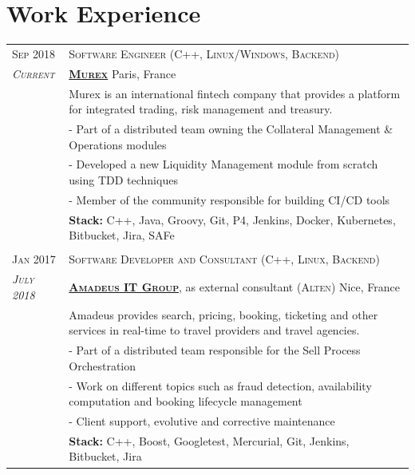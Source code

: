 \documentclass[a4paper,10pt]{article}
\begin{document}
   \vspace{-7.5mm}

   \section{Work Experience}
   \begin{tabular}{p{1.7cm}|p{15.5cm}}
      \centering\textsc{Sep 2018} &
      \textsc{Software Engineer (C++, Linux/Windows, Backend)}\\
      \centering\emph{\textsc{Current}} &
      \textsc{\textbf{\href{https://www.murex.com/}{Murex}}} \hfill Paris, France\\
      & Murex is an international fintech company that provides a platform for integrated trading, risk management and treasury.\\
      & - Part of a distributed team owning the Collateral Management \& Operations modules\\
      & - Developed a new Liquidity Management module from scratch using TDD techniques\\
      & - Member of the community responsible for building CI/CD tools\\
      & \textbf{Stack:} C++, Java, Groovy, Git, P4, Jenkins, Docker, Kubernetes, Bitbucket, Jira, SAFe\\
      
      \multicolumn{2}{c}{} \\
      \centering\textsc{Jan 2017} &
      \textsc{Software Developer and Consultant (C++, Linux, Backend)} \\
      \centering\emph{\textsc{July 2018}} &
      \textsc{\textbf{\href{http://www.amadeus.com/}{Amadeus IT Group}}}, as external consultant (\textsc{Alten}) \hfill Nice, France\\
      & Amadeus provides search, pricing, booking, ticketing and other services in real-time to travel providers and travel agencies.\\
      & - Part of a distributed team responsible for the Sell Process Orchestration\\
      & - Work on different topics such as fraud detection, availability computation and booking lifecycle management\\
      & - Client support, evolutive and corrective maintenance\\
      & \textbf{Stack:} C++, Boost, Googletest, Mercurial, Git, Jenkins, Bitbucket, Jira\\


\end{tabular}
\end{document}
